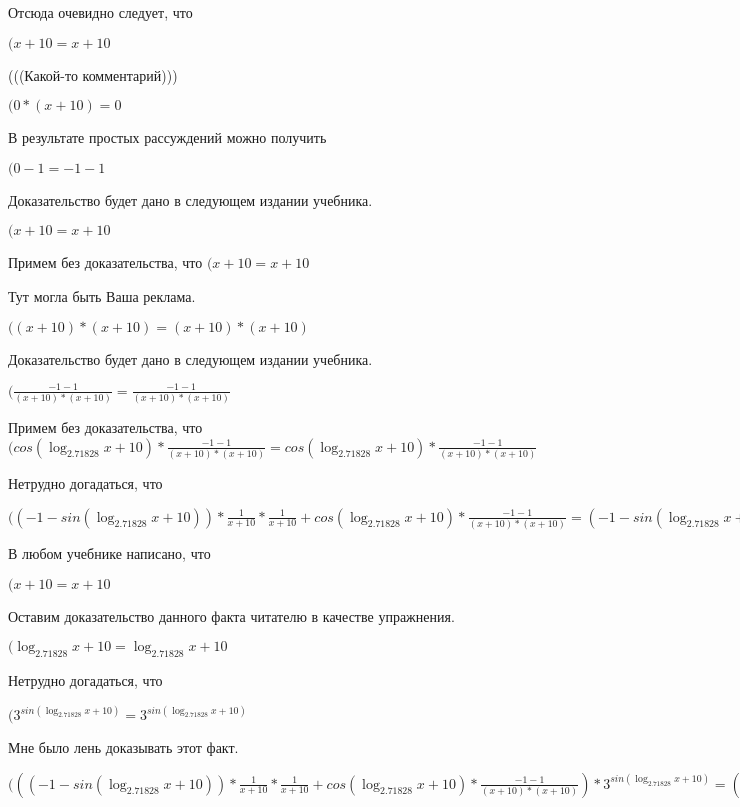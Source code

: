 \documentclass[12pt,a4paper,fleqn]{article}
\theoremstyle{definition}
\begin{document}
Отсюда очевидно следует, что

$( x  +  10  =  x  +  10 $

(((Какой-то комментарий)))

$( 0  * ( x  +  10 ) =  0 $

В результате простых рассуждений можно получить

$( 0  -  1  =  -1  -  1 $

Доказательство будет дано в следующем издании учебника.

$( x  +  10  =  x  +  10 $

Примем без доказательства, что
$( x  +  10  =  x  +  10 $

Тут могла быть Ваша реклама.

$(( x  +  10 ) * ( x  +  10 ) = ( x  +  10 ) * ( x  +  10 )$

Доказательство будет дано в следующем издании учебника.

$(\frac{ -1  -  1 }{( x  +  10 ) * ( x  +  10 )}
 = \frac{ -1  -  1 }{( x  +  10 ) * ( x  +  10 )}
$

Примем без доказательства, что
$(cos(\log_{ 2.71828 }{ x  +  10 }) * \frac{ -1  -  1 }{( x  +  10 ) * ( x  +  10 )}
 = cos(\log_{ 2.71828 }{ x  +  10 }) * \frac{ -1  -  1 }{( x  +  10 ) * ( x  +  10 )}
$

Нетрудно догадаться, что

$(( -1  - sin(\log_{ 2.71828 }{ x  +  10 })) * \frac{ 1 }{ x  +  10 }
 * \frac{ 1 }{ x  +  10 }
 + cos(\log_{ 2.71828 }{ x  +  10 }) * \frac{ -1  -  1 }{( x  +  10 ) * ( x  +  10 )}
 = ( -1  - sin(\log_{ 2.71828 }{ x  +  10 })) * \frac{ 1 }{ x  +  10 }
 * \frac{ 1 }{ x  +  10 }
 + cos(\log_{ 2.71828 }{ x  +  10 }) * \frac{ -1  -  1 }{( x  +  10 ) * ( x  +  10 )}
$

В любом учебнике написано, что

$( x  +  10  =  x  +  10 $

Оставим доказательство данного факта читателю в качестве упражнения.

$(\log_{ 2.71828 }{ x  +  10 } = \log_{ 2.71828 }{ x  +  10 }$

Нетрудно догадаться, что

$({ 3 }^{sin(\log_{ 2.71828 }{ x  +  10 })} = { 3 }^{sin(\log_{ 2.71828 }{ x  +  10 })}$

Мне было лень доказывать этот факт.

$((( -1  - sin(\log_{ 2.71828 }{ x  +  10 })) * \frac{ 1 }{ x  +  10 }
 * \frac{ 1 }{ x  +  10 }
 + cos(\log_{ 2.71828 }{ x  +  10 }) * \frac{ -1  -  1 }{( x  +  10 ) * ( x  +  10 )}
) * { 3 }^{sin(\log_{ 2.71828 }{ x  +  10 })} = (( -1  - sin(\log_{ 2.71828 }{ x  +  10 })) * \frac{ 1 }{ x  +  10 }
 * \frac{ 1 }{ x  +  10 }
 + cos(\log_{ 2.71828 }{ x  +  10 }) * \frac{ -1  -  1 }{( x  +  10 ) * ( x  +  10 )}
) * { 3 }^{sin(\log_{ 2.71828 }{ x  +  10 })}$
\end{document}
